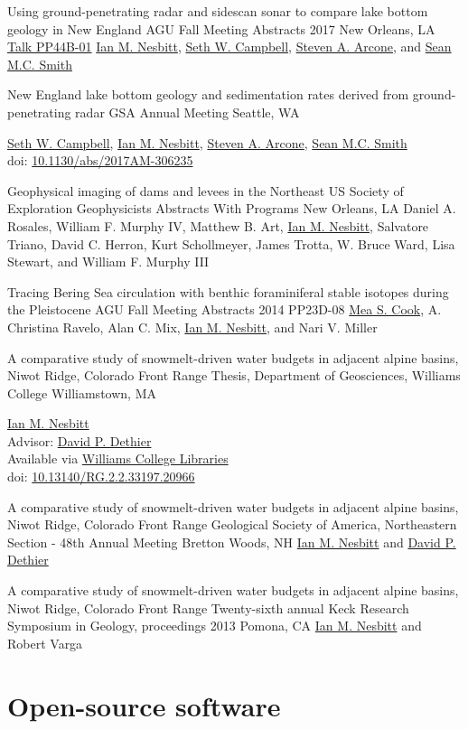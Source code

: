 \documentclass[a4paper,12pt,sans,colorlinks]{moderncv}
\newcommand{\me}{\href{https://www.iannesbitt.org}{Ian M. Nesbitt}}
\newcommand{\seth}{\href{https://www.alpinesciences.net}{Seth W. Campbell}}
\newcommand{\sean}{\href{https://umaine.edu/earthclimate/people/sean-m-c-smith/}{Sean M.C. Smith}}
\newcommand{\stevearcone}{\href{https://engineering.dartmouth.edu/community/faculty/steven-arcone}{Steven A. Arcone}}
\newcommand{\mea}{\href{https://geosciences.williams.edu/profile/msc1/}{Mea S. Cook}}
\newcommand{\david}{\href{https://geosciences.williams.edu/profile/ddethier/}{David P. Dethier}}
\newcommand{\agunola}{\href{https://agu.confex.com/agu/fm17/meetingapp.cgi/Paper/260265}{Talk PP44B-01}}
\newcommand{\williamsthesis}{\href{https://unbound.williams.edu/theses/islandora/object/studenttheses:766}{Williams College Libraries}}
\newcommand{\doi}[1]{%
    \href{https://doi.org/#1}{#1}
}
\begin{document}
{Using ground-penetrating radar and sidescan sonar to
compare lake bottom geology in New England}
{AGU Fall Meeting Abstracts 2017}
{New Orleans, LA}
{\agunola}
{
    \me{}, \seth{}, \stevearcone{}, and \sean{}
}

{New England lake bottom geology and sedimentation
rates derived from ground-penetrating radar}
{GSA Annual Meeting}
{Seattle, WA}
{}
{
    \seth{}, \me{}, \stevearcone{}, \sean{}
    \\
    doi: \doi{10.1130/abs/2017AM-306235}
}

{Geophysical imaging of dams and levees in the Northeast US}
{Society of Exploration Geophysicists Abstracts With Programs}
{New Orleans, LA}
{}
{Daniel A. Rosales, William F. Murphy IV, Matthew B. Art,
\me, Salvatore Triano, David C. Herron, Kurt Schollmeyer,
James Trotta, W. Bruce Ward, Lisa Stewart, and William F.
Murphy III}

{Tracing Bering Sea circulation with benthic
foraminiferal stable isotopes during the Pleistocene}
{AGU Fall Meeting Abstracts 2014}
{}
{PP23D-08}
{
    \mea{}, A. Christina Ravelo, Alan C. Mix, \me{},
    and Nari V. Miller
}

{A comparative study of snowmelt-driven water budgets in
adjacent alpine basins, Niwot Ridge, Colorado Front Range}
{Thesis, Department of Geosciences, Williams College}
{Williamstown, MA}
{}
{
    \me{}
    \\
    Advisor: \david
    \\
    Available via \williamsthesis
    \\
    doi: \doi{10.13140/RG.2.2.33197.20966}
}

{A comparative study of snowmelt-driven water budgets in
adjacent alpine basins, Niwot Ridge, Colorado Front Range}
{Geological Society of America, Northeastern Section - 48th Annual Meeting}
{Bretton Woods, NH}
{}
{
    \me{} and \david{}
}

{A comparative study of snowmelt-driven water budgets in
adjacent alpine basins, Niwot Ridge, Colorado Front Range}
{Twenty-sixth annual Keck Research Symposium in Geology, proceedings 2013}
{Pomona, CA}
{}
{
    \me{} and Robert Varga
}


\section{Open-source software}
\end{document}

